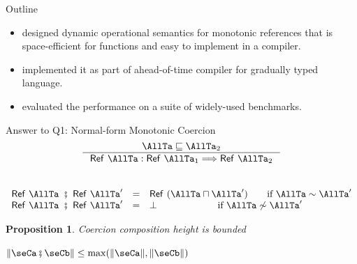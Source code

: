 \documentclass[12pt,dvipsnames]{beamer}
\newcommand{\RefT}[1]{\ensuremath{\mathsf{Ref}\ #1}}
\newcommand{\TypePreciseness}{\sqsubseteq}
\newcommand{\RefCoercion}[1]{\ensuremath{\mathsf{Ref}\ #1}}
\newcommand{\FailCoercionSE}{\ensuremath{\bot}}
\newcommand{\glbt}{\sqcap}
\newcommand{\ComposeCoercion}{\fatsemi}
\newcounter{stuff}
\newtheorem{prop}[stuff]{Proposition}
\begin{document}
\begin{frame}{Outline}
  \begin{itemize}
  \item designed dynamic operational semantics for monotonic references
    that is space-efficient for functions and easy to implement in a
    compiler.
  \item implemented it as part of ahead-of-time compiler for gradually
    typed language.
  \item evaluated the performance on a suite of widely-used benchmarks.
  \end{itemize}
\end{frame}

\begin{frame}{Answer to Q1: Normal-form Monotonic Coercion}
\begin{gather*}
  \inference{\AllTa \TypePreciseness \AllTa_2}{\RefCoercion{\AllTa} : \RefT{\AllTa_1} \Longrightarrow
    \RefT{\AllTa_2}}
\end{gather*}
\\
\[
    \begin{array}{rcl}
      \RefCoercion{\AllTa}\ \ComposeCoercion\ \RefCoercion{\AllTa'}
                                        & = &
                                              \RefCoercion{(\AllTa \glbt
                                              \AllTa')} \qquad \text{if } \AllTa \sim
                                              \AllTa'  \\
      \RefCoercion{\AllTa}\ \ComposeCoercion\ \RefCoercion{\AllTa'}
                                        & = &
                                              \FailCoercionSE
                                              \qquad\qquad\qquad \text{ if } \AllTa \not\sim
                                              \AllTa'
    \end{array}
  \]

\begin{prop}{Coercion composition height is bounded}
  \begin{center}
    $\| \seCa \ComposeCoercion \seCb\| \leq \max (\| \seCa \|, \| \seCb
    \|)$
  \end{center}
\end{prop}
\end{frame}
\end{document}
